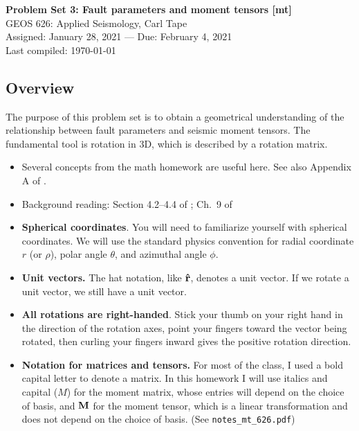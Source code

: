 \documentclass[11pt,titlepage,fleqn]{article}
\begin{document}

\begin{spacing}{1.2}
\centering
{\large \bf Problem Set 3: Fault parameters and moment tensors [mt]} \\
GEOS 626: Applied Seismology, Carl Tape \\
Assigned: January 28, 2021 --- Due: February 4, 2021 \\
Last compiled: \today
\end{spacing}

\begin{spacing}{1.0}

\subsection*{Overview}

The purpose of this problem set is to obtain a geometrical understanding of the relationship between fault parameters and seismic moment tensors. The fundamental tool is rotation in 3D, which is described by a rotation matrix.

\begin{itemize}
\item Several concepts from the math homework are useful here. See also Appendix A of \citet{SteinWysession}.

\item Background reading: Section 4.2--4.4 of \citet{SteinWysession}; Ch.~9 of \citet{ShearerE2}

\item {\bf Spherical coordinates}. You will need to familiarize yourself with spherical coordinates. We will use the standard physics convention for radial coordinate $r$ (or $\rho$), polar angle $\theta$, and azimuthal angle $\phi$.

\item {\bf Unit vectors.} The hat notation, like $\mbox{\boldmath{$\hat{\rm r}$}}$, denotes a unit vector. If we rotate a unit vector, we still have a unit vector.

\item {\bf All rotations are right-handed}. Stick your thumb on your right hand in the direction of the rotation axes, point your fingers toward the vector being rotated, then curling your fingers inward gives the positive rotation direction.

\item {\bf Notation for matrices and tensors.} For most of the class, I used a bold capital letter to denote a matrix. In this homework I will use italics and capital ($M$) for the moment matrix, whose entries will depend on the choice of basis, and $\mbox{${\bf M}$}$ for the moment tensor, which is a linear transformation and does not depend on the choice of basis. (See \verb+notes_mt_626.pdf+)


\end{itemize}
\end{spacing}
\end{document}
